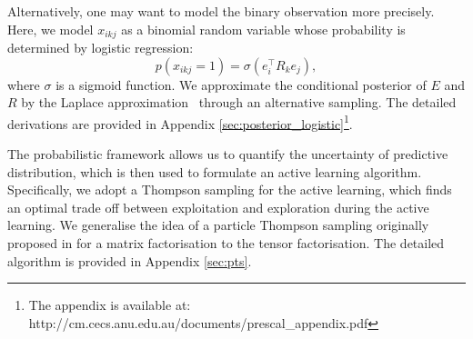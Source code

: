 Alternatively, one may want to model the binary observation more precisely.
Here, we model $x_{ikj}$ as a binomial random variable whose
probability is determined by logistic regression:
\[
p(x_{ikj}=1) = \sigma(e_i^{\top} R_k e_j),
\]
where $\sigma$ is a sigmoid function.
We approximate the conditional posterior of
$E$ and $R$ by the Laplace approximation~\cite{bishop2006pattern} through an alternative sampling. The detailed derivations are provided in Appendix \ref{sec:posterior_logistic}\footnote{The appendix is available at: http://cm.cecs.anu.edu.au/documents/prescal\_appendix.pdf}.

The probabilistic framework allows us to quantify the uncertainty of predictive distribution, which is then used to formulate an active learning algorithm. Specifically, we adopt a Thompson sampling for the active learning, which finds an optimal trade off between exploitation and exploration during the active learning. We generalise the idea of a particle Thompson sampling originally proposed in \cite{kawale2015efficient} for a matrix factorisation to the tensor factorisation. The detailed algorithm is provided in Appendix \ref{sec:pts}.
